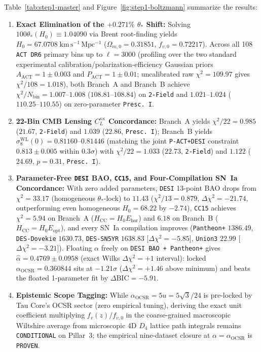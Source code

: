 \documentclass[11pt,a4paper]{article}
\begin{document}
Table~\ref{tab:step1-master} and Figure~\ref{fig:step1-boltzmann} summarize the results:
\begin{enumerate}
    \item \textbf{Exact Elimination of the $+0.271\%$ $\theta_*$ Shift:} Solving $100\theta_*(H_0) \equiv 1.04090$ via Brent root-finding yields $H_0 = 67.0708\;\mathrm{km\,s^{-1}\,Mpc^{-1}}$ ($\Omega_{m,0} = 0.31851$, $f_{v,0} = 0.72217$). Across all 108 \texttt{ACT DR6} primary bins up to $\ell = 3000$ (profiling over the two standard experimental calibration/polarization-efficiency Gaussian priors $A_{\mathrm{ACT}} = 1 \pm 0.003$ and $P_{\mathrm{ACT}} = 1 \pm 0.01$; uncalibrated raw $\chi^2 = 109.97$ gives $\chi^2/108 = 1.018$), both Branch~A and Branch~B achieve $\chi^2/N_{\mathrm{bin}} = 1.007\text{--}1.008$ ($108.81\text{--}108.84$) on \texttt{2-Field} and $1.021\text{--}1.024$ ($110.25\text{--}110.55$) on zero-parameter \texttt{Presc.~I}.
    \item \textbf{22-Bin CMB Lensing $C_L^{\kappa\kappa}$ Concordance:} Branch~A yields $\chi^2/22 = 0.985$ ($21.67$, \texttt{2-Field}) and $1.039$ ($22.86$, \texttt{Presc.~I}); Branch~B yields $\sigma_8^{\mathrm{WL}}(0) = 0.81160\text{--}0.81446$ (matching the joint \texttt{P-ACT+DESI} constraint $0.813 \pm 0.005$ within $0.3\sigma$) with $\chi^2/22 = 1.033$ ($22.73$, \texttt{2-Field}) and $1.122$ ($24.69$, $p = 0.31$, \texttt{Presc.~I}).
    \item \textbf{Parameter-Free \texttt{DESI} BAO, \texttt{CC15}, and Four-Compilation SN~Ia Concordance:} With zero added parameters, \texttt{DESI} 13-point BAO drops from $\chi^2 = 33.17$ (homogeneous $\theta_*$-lock) to $\mathbf{11.43}$ ($\chi^2/13 = 0.879$, $\Delta\chi^2 = -21.74$, outperforming even homogeneous $H_0 = 68.22$ by $-2.74$), \texttt{CC15} achieves $\chi^2 = 5.94$ on Branch~A ($H_{\mathrm{CC}} = H_0 E_{\mathrm{hor}}$) and $6.18$ on Branch~B ($H_{\mathrm{CC}} = H_0 E_{\mathrm{opt}}$), and every SN~Ia compilation improves (\texttt{Pantheon+} $1386.49$, \texttt{DES-Dovekie} $1630.73$, \texttt{DES-SN5YR} $1638.83$ [$\Delta\chi^2 = -5.85$], \texttt{Union3} $22.99$ [$\Delta\chi^2 = -3.21$]). Floating $\alpha$ freely on \texttt{DESI BAO + Pantheon+} gives $\hat{\alpha} = 0.4769 \pm 0.0958$ (exact Wilks $\Delta\chi^2 = +1$ interval): locked $\alpha_{\mathrm{OCSR}} = 0.360844$ sits at $-1.21\sigma$ ($\Delta\chi^2 = +1.46$ above minimum) and beats the floated 1-parameter fit by $\Delta\mathrm{BIC} = -5.91$.
    \item \textbf{Epistemic Scope Tagging:} While $\alpha_{\mathrm{OCSR}} = 5u = 5\sqrt{3}/24$ is pre-locked by Tau Core's OCSR sector (zero empirical tuning), deriving the exact unit coefficient multiplying $f_v(z)/f_{v,0}$ in the coarse-grained macroscopic Wiltshire average from microscopic 4D $D_4$ lattice path integrals remains \texttt{CONDITIONAL} on Pillar~3; the empirical nine-dataset closure at $\alpha = \alpha_{\mathrm{OCSR}}$ is \texttt{PROVEN}.
\end{enumerate}
\end{document}
